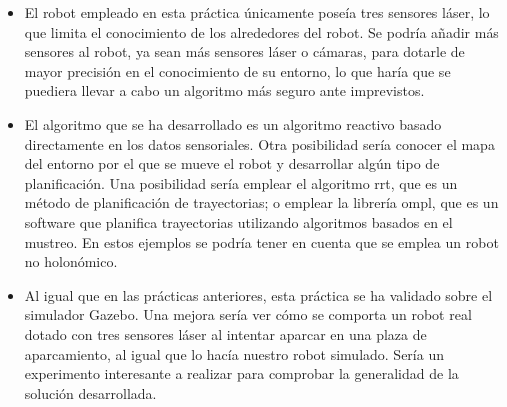 \begin{itemize}
\item El robot empleado en esta práctica únicamente poseía tres sensores láser, lo que limita el conocimiento de los alrededores del robot. Se podría añadir más sensores al robot, ya sean más sensores láser o cámaras, para dotarle de mayor precisión en el conocimiento de su entorno, lo que haría que se puediera llevar a cabo un algoritmo más seguro ante imprevistos.
\item El algoritmo que se ha desarrollado es un algoritmo reactivo basado directamente en los datos sensoriales. Otra posibilidad sería conocer el mapa del entorno por el que se mueve el robot y desarrollar algún tipo de planificación. Una posibilidad sería emplear el algoritmo \acrfull{rrt}, que es un método de planificación de trayectorias; o emplear la librería \acrfull{ompl}, que es un software que planifica trayectorias utilizando algoritmos basados en el mustreo. En estos ejemplos se podría tener en cuenta que se emplea un robot no holonómico.
\item Al igual que en las prácticas anteriores, esta práctica se ha validado sobre el simulador Gazebo. Una mejora sería ver cómo se comporta un robot real dotado con tres sensores láser al intentar aparcar en una plaza de aparcamiento, al igual que lo hacía nuestro robot simulado. Sería un experimento interesante a realizar para comprobar la generalidad de la solución desarrollada.
\end{itemize}

